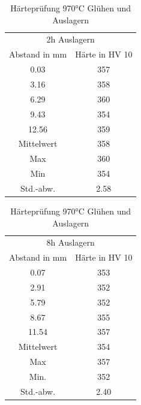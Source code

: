 \documentclass[a4paper, 11pt]{tubsreprt}
\begin{document}
\begin{table}[t] 	%
\begin{tabular}{c | c}
\multicolumn{2}{c}{2h Auslagern} \\
\cline{1-2}
Abstand in mm & Härte in HV 10 \\
0.03 & 357 \\
3.16 & 358 \\
6.29 & 360 \\
9.43 & 354 \\
12.56 & 359 \\
Mittelwert & 358 \\
Max & 360 \\
Min & 354 \\
Std.-abw. & 2.58 \\
\end{tabular}
\begin{tabular}{c | c}
\multicolumn{2}{c}{8h Auslagern} \\
\cline{1-2}
Abstand in mm & Härte in HV 10 \\
0.07	&		353 \\
2.91	&		352 \\
5.79	&		352\\
8.67	& 		355\\
11.54	& 		357\\
Mittelwert &	354\\
Max	& 			357\\
Min. &			352	\\	
Std.-abw.	&	2.40\\

\end{tabular}
\caption{Härteprüfung 970°C Glühen und Auslagern}
\label{heartepruefung9702h}
\end{table}
\end{document}
